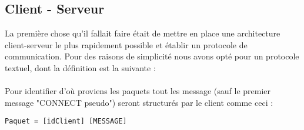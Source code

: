 \subsection{Client - Serveur}

La première chose qu'il fallait faire était de mettre en place une architecture client-serveur le plus rapidement possible et établir un protocole de communication. Pour des raisons de simplicité nous avons opté pour un protocole textuel, dont la définition est la suivante :

\paragraph{}
Pour identifier d'où proviens les paquets tout les message (sauf le premier message "CONNECT pseudo") seront structurés par le client comme ceci :
\begin{verbatim}Paquet = [idClient] [MESSAGE]\end{verbatim}

